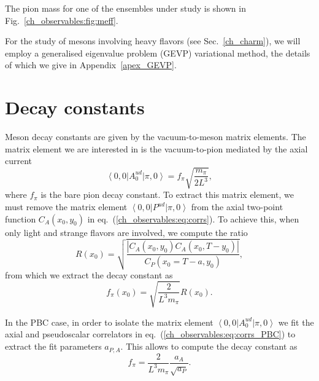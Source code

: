 The pion mass for one of the ensembles under study is shown in Fig.~\ref{ch_observables:fig:meff}.

For the study of mesons involving heavy flavors (see Sec.~\ref{ch_charm}), we will employ a generalised eigenvalue problem (GEVP) variational method, the details of which we give in Appendix~\ref{apex_GEVP}.


\section{Decay constants}
\label{ch_observables:sec:dec_const}

Meson decay constants are given by the vacuum-to-meson matrix elements. The matrix element we are interested in is the vacuum-to-pion mediated by the axial current
\begin{equation}
\label{ch_observables:eq:axial_matrix_element}
\left<0,0\right|A_0^{ud}\left|\pi,0\right>=f_{\pi}\sqrt{\frac{m_{\pi}}{2L^3}},
\end{equation}
where $f_{\pi}$ is the bare pion decay constant. To extract this matrix element, we must remove the matrix element $\left<0,0\right|P^{ud}\left|\pi,0\right>$ from the axial two-point function $C_A(x_0,y_0)$ in eq.~(\ref{ch_observables:eq:corrs}). To achieve this, when only light and strange flavors are involved, we compute the ratio
\begin{equation}
\label{ch_observables:eq:R}
R(x_0)=\sqrt{\frac{\left|C_A(x_0,y_0)C_A(x_0,T-y_0)\right|}{C_P(x_0=T-a,y_0)}},
\end{equation}
from which we extract the decay constant as
\begin{equation}
f_{\pi}(x_0)=\sqrt{\frac{2}{L^3m_{\pi}}}R(x_0).
\end{equation}

In the PBC case, in order to isolate the matrix element $\left<0,0\right|A_0^{ud}\left|\pi,0\right>$ we fit the axial and pseudoscalar correlators in eq.~(\ref{ch_observables:eq:corrs_PBC}) to extract the fit parameters $a_{P,A}$. This allows to compute the decay constant as
\begin{equation}
f_{\pi}=\frac{2}{L^3m_{\pi}}\frac{a_A}{\sqrt{a_P}}.
\end{equation}

